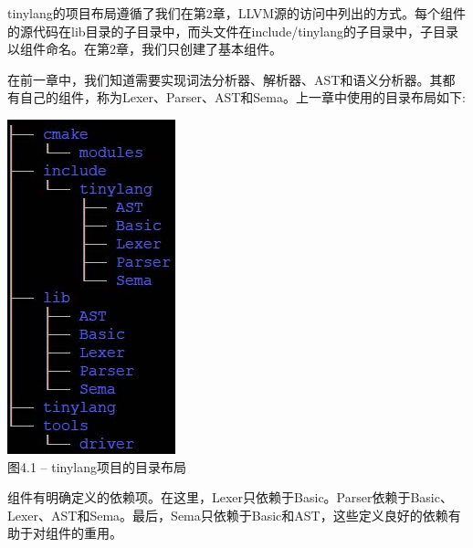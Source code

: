 tinylang的项目布局遵循了我们在第2章，LLVM源的访问中列出的方式。每个组件的源代码在lib目录的子目录中，而头文件在include/tinylang的子目录中，子目录以组件命名。在第2章，我们只创建了基本组件。\par

在前一章中，我们知道需要实现词法分析器、解析器、AST和语义分析器。其都有自己的组件，称为Lexer、Parser、AST和Sema。上一章中使用的目录布局如下:\par

\hspace*{\fill} \par %
\begin{center}
\includegraphics{content/2/chapter4/images/1.jpg}\\
图4.1 – tinylang项目的目录布局
\end{center}

组件有明确定义的依赖项。在这里，Lexer只依赖于Basic。Parser依赖于Basic、Lexer、AST和Sema。最后，Sema只依赖于Basic和AST，这些定义良好的依赖有助于对组件的重用。\par

